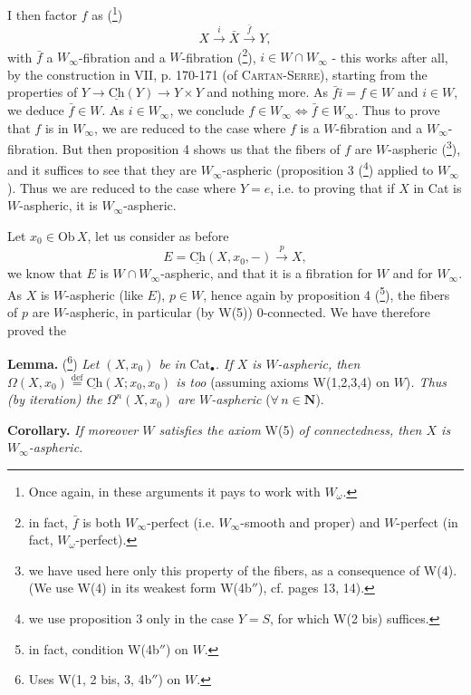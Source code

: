 \documentclass[11pt]{article}
\newcommand{\printedpage}[1]{\marginpar{\footnotesize p.~#1}}
\newcommand{\msp}[1]{\marginpar{\footnotesize [#1]}}
\newcommand{\Ch}{\underline{\mathrm{Ch}}}
\begin{document}
\msp{page 11}I then factor $f$ as (\footnote[19]{Once again, in these arguments it pays to work with $W_\omega$.})
\[ X \xrightarrow{i} \bar{X} \xrightarrow{\bar{f}} Y, \]
with $\bar{f}$ a $W_\infty$-fibration and a $W$-fibration (\footnote[20]{in fact, $\bar{f}$ is both $W_\infty$-perfect (i.e. $W_\infty$-smooth and proper) and $W$-perfect (in fact, $W_\omega$-perfect).}), $i \in W \cap W_\infty$ - this works after all, %
by the construction in VII, p. 170-171 (of \textsc{Cartan-Serre}), starting from the properties of %
$Y \longrightarrow \Ch(Y) \longrightarrow Y \times Y$ and nothing more. As $\bar{f} i = f \in W$ and $i \in W$, we deduce $\bar{f} \in W$. As $i \in W_\infty$, we conclude $f \in W_\infty \iff \bar{f} \in W_\infty$. Thus to prove that $f$ is in $W_\infty$, we are reduced to the case where $f$ is a $W$-fibration and a $W_\infty$-fibration. But then proposition 4 shows us that the fibers of $f$ are $W$-aspheric (\footnote[21]{we have used here only this property of the fibers, as a consequence of W(4). (We use W(4) in its weakest form W(4b$''$), cf. pages 13, 14).}), and it suffices to see that they are $W_\infty$-aspheric (proposition 3 (\footnote[22]{we use proposition 3 only in the case $Y = S$, for which W(2 bis) suffices.}) applied to $W_\infty$). Thus we are reduced to the case where $Y = e$, i.e. to proving that if $X$ in Cat is $W$-aspheric, it is $W_\infty$-aspheric.

Let $x_0 \in \mathrm{Ob}\, X$, let us consider as before
\[ E = \Ch(X, x_0, -) \xrightarrow{p} X, \]
\printedpage{10}
we know that $E$ is $W \cap W_\infty$-aspheric, and that it is a fibration for $W$ and for $W_\infty$. As $X$ is $W$-aspheric (like $E$), $p \in W$, hence again by proposition 4 (\footnote[23]{in fact, condition W(4b$''$) on $W$.}), the fibers of $p$ are $W$-aspheric, in particular (by W(5)) 0-connected. We have therefore proved the

\msp{page 12}\textbf{Lemma.} (\footnote[24]{Uses W(1, 2 bis, 3, 4b$''$) on $W$.}) \textit{Let $(X, x_0)$ be in} Cat$_\bullet$\textit{. If $X$ is $W$-aspheric, then $\Omega(X, x_0) \overset{\text{def}}{=} \Ch(X; x_0, x_0)$ is too} (assuming axioms W(1,2,3,4) on $W$)\textit{. Thus (by iteration) the $\Omega^n(X, x_0)$ are $W$-aspheric} ($\forall\, n \in \mathbf{N}$).

\textbf{Corollary.} \textit{If moreover $W$ satisfies the axiom} W(5) \textit{of connectedness, then $X$ is $W_\infty$-aspheric.}
\end{document}
